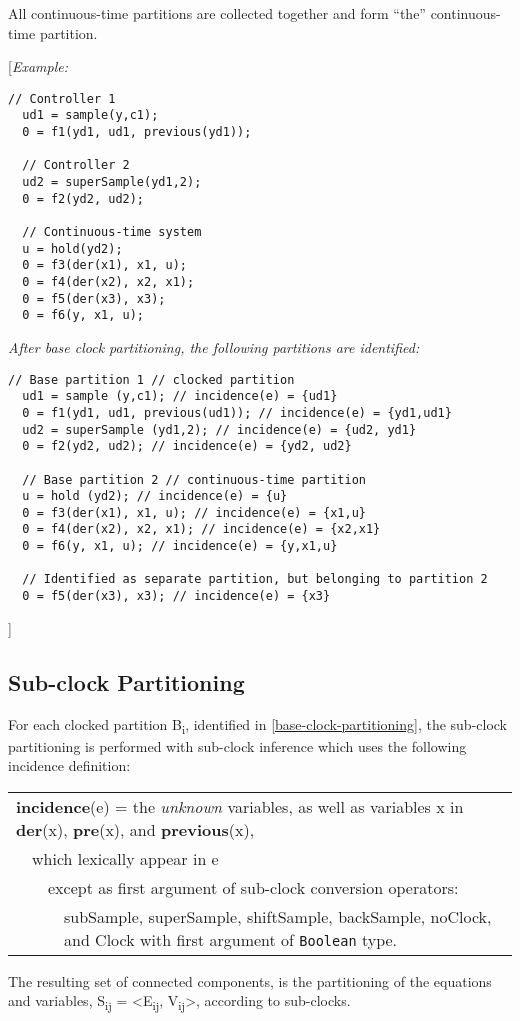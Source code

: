 All continuous-time partitions are collected together and form ``the''
continuous-time partition.

{[}\emph{Example:}
\begin{lstlisting}[language=modelica]
  // Controller 1
  ud1 = sample(y,c1);
  0 = f1(yd1, ud1, previous(yd1));

  // Controller 2
  ud2 = superSample(yd1,2);
  0 = f2(yd2, ud2);

  // Continuous-time system
  u = hold(yd2);
  0 = f3(der(x1), x1, u);
  0 = f4(der(x2), x2, x1);
  0 = f5(der(x3), x3);
  0 = f6(y, x1, u);
\end{lstlisting}

\emph{After base clock partitioning, the following partitions are
identified:}

\begin{lstlisting}[language=modelica]
  // Base partition 1 // clocked partition
  ud1 = sample (y,c1); // incidence(e) = {ud1}
  0 = f1(yd1, ud1, previous(ud1)); // incidence(e) = {yd1,ud1}
  ud2 = superSample (yd1,2); // incidence(e) = {ud2, yd1}
  0 = f2(yd2, ud2); // incidence(e) = {yd2, ud2}
  
  // Base partition 2 // continuous-time partition
  u = hold (yd2); // incidence(e) = {u}
  0 = f3(der(x1), x1, u); // incidence(e) = {x1,u}
  0 = f4(der(x2), x2, x1); // incidence(e) = {x2,x1}
  0 = f6(y, x1, u); // incidence(e) = {y,x1,u}
  
  // Identified as separate partition, but belonging to partition 2
  0 = f5(der(x3), x3); // incidence(e) = {x3}
\end{lstlisting}
{]}

\subsection{Sub-clock Partitioning}

For each clocked partition B\textsubscript{i}, identified in 
\autoref{base-clock-partitioning}, the sub-clock partitioning is performed with sub-clock inference
which uses the following incidence definition:

\begin{tabular}{p{1cm}p{1cm}p{1cm}p{12cm}}
\multicolumn{4}{p{15cm}}{\textbf{incidence}(e) = the \emph{unknown} variables, as well as
variables x in \textbf{der}(x), \textbf{pre}(x), and
\textbf{previous}(x),}\\
&\multicolumn{3}{p{14cm}}{which lexically appear in e}\\
&&\multicolumn{2}{p{13cm}}{except as first argument of sub-clock conversion operators:}\\
&&&\multicolumn{1}{p{12cm}}{subSample, superSample, shiftSample, backSample, noClock, and Clock with first argument of \lstinline!Boolean! type.}
\end{tabular}
The resulting set of connected components, is the partitioning of the
equations and variables, S\textsubscript{ij} =
\textless{}E\textsubscript{ij}, V\textsubscript{ij}\textgreater{},
according to sub-clocks.

